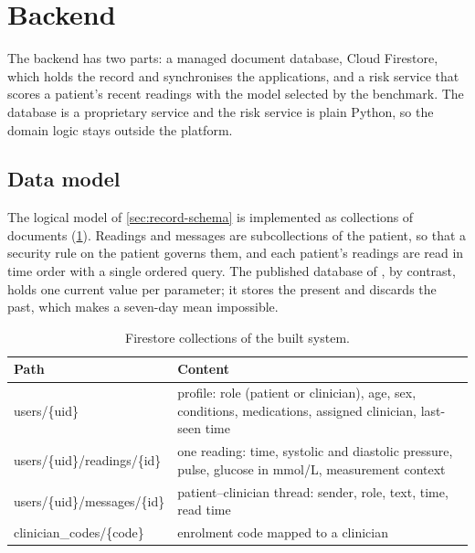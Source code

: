 
\section{Backend}\label{sec:backend}\label{sec:tree-property}\label{sec:schema-counterexample}\label{sec:schema-design}\label{sec:key-design}

The backend has two parts: a managed document database, Cloud Firestore, which holds the record and synchronises the applications, and a risk service that scores a patient's recent readings with the model selected by the benchmark. The database is a proprietary service and the risk service is plain Python, so the domain logic stays outside the platform.

\subsection{Data model}\label{sec:firestore-model}

The logical model of \cref{sec:record-schema} is implemented as collections of documents (\cref{tab:collections}). Readings and messages are subcollections of the patient, so that a security rule on the patient governs them, and each patient's readings are read in time order with a single ordered query. The published database of \textcite{efendi2025}, by contrast, holds one current value per parameter; it stores the present and discards the past, which makes a seven-day mean impossible.

\begin{table}[htbp]
\centering\footnotesize
\caption{Firestore collections of the built system.}\label{tab:collections}
\begin{tabularx}{\textwidth}{@{}>{\raggedright\arraybackslash\ttfamily\scriptsize}p{4.2cm} X@{}}
\toprule
\normalfont\textbf{Path} & \textbf{Content} \\
\midrule
users/\{uid\} & profile: role (patient or clinician), age, sex, conditions, medications, assigned clinician, last-seen time \\
users/\{uid\}/readings/\{id\} & one reading: time, systolic and diastolic pressure, pulse, glucose in mmol/L, measurement context \\
users/\{uid\}/messages/\{id\} & patient--clinician thread: sender, role, text, time, read time \\
clinician\_codes/\{code\} & enrolment code mapped to a clinician \\
\bottomrule
\end{tabularx}
\end{table}

